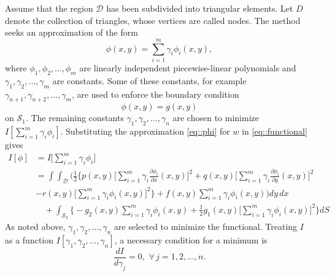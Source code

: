 \documentclass[a4paper]{article}
\begin{document}
Assume that the region $\mathcal{D}$ has been subdivided into triangular elements. Let $D$ denote the collection of triangles, whose vertices are called nodes. The method seeks an approximation of the form
\begin{equation}
\phi(x,y)=\sum_{i=1}^{m}\gamma_i \phi_i(x,y),
\end{equation}
where $\phi_1,\phi_2,\hdots,\phi_m$ are linearly independent piecewise-linear polynomials and $\gamma_1,\gamma_2,\hdots,\gamma_m$ are constants. Some of these constants, for example $\gamma_{n+1},\gamma_{n+2},\hdots,\gamma_m$, are used to enforce the boundary condition
\begin{equation}\label{eq::phi}
\phi(x,y)=g(x,y)
\end{equation}
on $\mathcal{S}_1$. The remaining constants $\gamma_1,\gamma_2,\hdots,\gamma_n$ are chosen to minimize $I[\sum_{i=1}^m \gamma_i\phi_i]$. Substituting the approximation \ref{eq::phi} for $w$ in \ref{eq::functional} gives
\begin{equation}\label{eq::aproximated_functional}
\begin{aligned}
I[\phi]&=I\Big[ \sum_{i=1}^{m} \gamma_i \phi_i \Big]\\
&=\int\int_{\mathcal{D}}\Bigg(\frac{1}{2}\Bigg\{ p(x,y)\Big[ \sum_{i=1}^{m}\gamma_i \frac{\partial \phi_i}{\partial x}(x,y)\Big]^2 + q(x,y)\Big[ \sum_{i=1}^{m}\gamma_i \frac{\partial \phi_i}{\partial y}(x,y)\Big]^2\\
&-r(x,y)\Big[ \sum_{i=1}^{m}\gamma_i \phi_i(x,y)\Big]^2\Bigg\}+f(x,y)\sum_{i=1}^m \gamma_i \phi_i(x,y)\Bigg)dy\, dx\\
&\quad +\int_{\mathcal{S}_2}\Bigg\{ -g_2(x,y)\sum_{i=1}^m \gamma_i \phi_i(x,y)+\frac{1}{2}g_1(x,y)\Big[\sum_{i=1}^m \gamma_i \phi_i(x,y)\Big]^2\Bigg\}dS
\end{aligned}
\end{equation}
As noted above, $\gamma_1,\gamma_2,\hdots,\gamma_n$ are selected to minimize the functional. Treating $I$ as a function $I[\gamma_1,\gamma_2,\hdots,\gamma_n]$, a necessary condition for a minimum is
\begin{equation}\label{eq::minimun_condition}
\frac{d I}{d \gamma_j}=0,\,\, \forall\, j=1,2,\hdots,n.
\end{equation}
\end{document}
